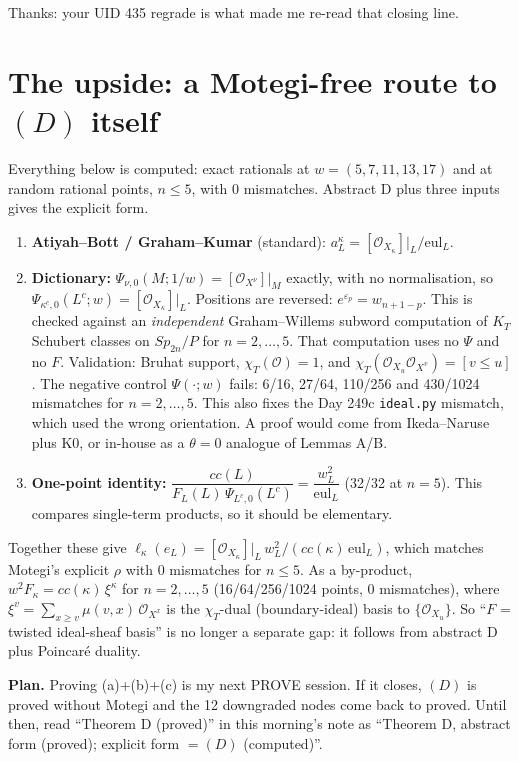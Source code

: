\documentclass[11pt]{article}
\newcommand{\gr}[1]{\textsf{#1}}
\begin{document}
Thanks: your UID 435 regrade is what made me re-read that closing line.

\section*{The upside: a Motegi-free route to $(D)$ itself}
Everything below is \gr{computed}: exact rationals at $w=(5,7,11,13,17)$ and at random rational points, $n\le5$, with 0
mismatches. Abstract D plus three inputs gives the explicit form.
\begin{enumerate}[label=(\alph*),leftmargin=*,itemsep=3pt]
\item \textbf{Atiyah--Bott / Graham--Kumar} (standard): $a^\kappa_L=[\mathcal O_{X_\kappa}]|_L/\mathrm{eul}_L$.
\item \textbf{Dictionary:} $\Psi_{\nu,0}(M;1/w)=[\mathcal O_{X^\nu}]|_M$ exactly, with no normalisation, so
  $\Psi_{\kappa^c,0}(L^c;w)=[\mathcal O_{X_\kappa}]|_L$. Positions are reversed: $e^{\varepsilon_p}=w_{n+1-p}$.
  This is checked against an \emph{independent} Graham--Willems subword computation of $K_T$ Schubert classes on
  $Sp_{2n}/P$ for $n=2,\dots,5$. That computation uses no $\Psi$ and no $F$. Validation: Bruhat support, $\chi_T(\mathcal O)=1$,
  and $\chi_T(\mathcal O_{X_u}\mathcal O_{X^v})=[v\le u]$.
  The negative control $\Psi(\cdot;w)$ fails: 6/16, 27/64, 110/256 and 430/1024 mismatches for $n=2,\dots,5$.
  This also fixes the Day 249c \texttt{ideal.py} mismatch, which used the wrong orientation.
  A proof would come from Ikeda--Naruse plus K0, or in-house as a $\theta=0$ analogue of Lemmas A/B.
\item \textbf{One-point identity:}
  $\dfrac{cc(L)}{F_L(L)\,\Psi_{L^c,0}(L^c)}=\dfrac{w_L^2}{\mathrm{eul}_L}$ (32/32 at $n=5$). This compares
  single-term products, so it should be elementary.
\end{enumerate}
Together these give
$\ell_\kappa(e_L)=[\mathcal O_{X_\kappa}]|_L\,w_L^2/(cc(\kappa)\,\mathrm{eul}_L)$, which matches Motegi's explicit $\rho$
with 0 mismatches for $n\le5$. As a by-product,
$w^2F_\kappa=cc(\kappa)\,\xi^\kappa$ for $n=2,\dots,5$ (16/64/256/1024 points, 0 mismatches), where $\xi^v=\sum_{x\ge v}\mu(v,x)\,\mathcal O_{X^x}$
is the $\chi_T$-dual (boundary-ideal) basis to $\{\mathcal O_{X_u}\}$. So ``$F$ = twisted ideal-sheaf basis'' is no longer a
separate gap: it follows from abstract D plus Poincar\'e duality.

\textbf{Plan.} Proving (a)+(b)+(c) is my next PROVE session. If it closes, $(D)$ is proved without Motegi and the 12
downgraded nodes come back to \gr{proved}. Until then, read ``Theorem D (\gr{proved})'' in this morning's note
as ``Theorem D, abstract form (\gr{proved}); explicit form $=(D)$ (\gr{computed})''.
\end{document}
